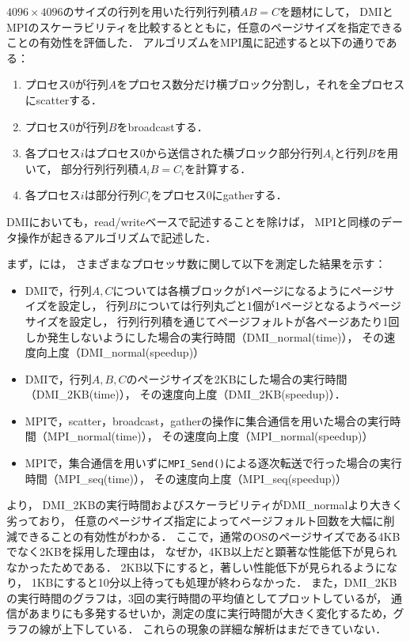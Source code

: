 \documentclass[10pt]{jsarticle}
\begin{document}
$4096\times4096$のサイズの行列を用いた行列行列積$AB=C$を題材にして，
DMIとMPIのスケーラビリティを比較するとともに，任意のページサイズを指定できることの有効性を評価した．
アルゴリズムをMPI風に記述すると以下の通りである：

\begin{enumerate}
\item プロセス0が行列$A$をプロセス数分だけ横ブロック分割し，それを全プロセスにscatterする．
\item プロセス0が行列$B$をbroadcastする．
\item 各プロセス$i$はプロセス0から送信された横ブロック部分行列$A_i$と行列$B$を用いて，
  部分行列行列積$A_iB=C_i$を計算する．
\item 各プロセス$i$は部分行列$C_i$をプロセス0にgatherする．
\end{enumerate}

DMIにおいても，read/writeベースで記述することを除けば，
MPIと同様のデータ操作が起きるアルゴリズムで記述した．

まず，には，
さまざまなプロセッサ数に関して以下を測定した結果を示す：

\begin{itemize}
\item DMIで，行列$A,C$については各横ブロックが1ページになるようにページサイズを設定し，
  行列$B$については行列丸ごと1個が1ページとなるようページサイズを設定し，
  行列行列積を通じてページフォルトが各ページあたり1回しか発生しないようにした場合の実行時間（DMI\_normal(time)），
  その速度向上度（DMI\_normal(speedup)）
\item DMIで，行列$A,B,C$のページサイズを2KBにした場合の実行時間（DMI\_2KB(time)），
  その速度向上度（DMI\_2KB(speedup)）．
\item MPIで，scatter，broadcast，gatherの操作に集合通信を用いた場合の実行時間（MPI\_normal(time)），
  その速度向上度（MPI\_normal(speedup)）
\item MPIで，集合通信を用いずに\texttt{MPI\_Send()}による逐次転送で行った場合の実行時間（MPI\_seq(time)），
  その速度向上度（MPI\_seq(speedup)）
\end{itemize}

より，
DMI\_2KBの実行時間およびスケーラビリティがDMI\_normalより大きく劣っており，
任意のページサイズ指定によってページフォルト回数を大幅に削減できることの有効性がわかる．
ここで，通常のOSのページサイズである4KBでなく2KBを採用した理由は，
なぜか，4KB以上だと顕著な性能低下が見られなかったためである．
2KB以下にすると，著しい性能低下が見られるようになり，
1KBにすると10分以上待っても処理が終わらなかった．
また，DMI\_2KBの実行時間のグラフは，3回の実行時間の平均値としてプロットしているが，
通信があまりにも多発するせいか，測定の度に実行時間が大きく変化するため，グラフの線が上下している．
これらの現象の詳細な解析はまだできていない．
\end{document}
